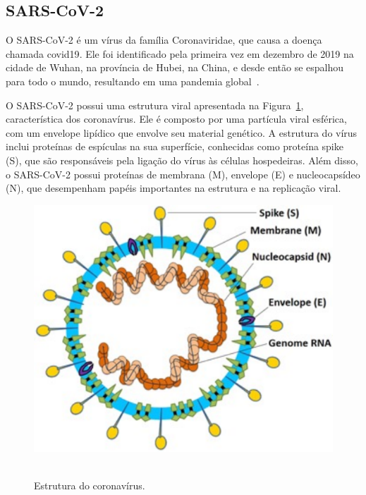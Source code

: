 \subsection{SARS-CoV-2}

O SARS-CoV-2 é um vírus da família Coronaviridae, que causa a doença chamada \gls{covid19}. Ele foi identificado pela primeira vez em dezembro de 2019 na cidade de Wuhan, na província de Hubei, na China, e desde então se espalhou para todo o mundo, resultando em uma pandemia global~\cite{zhu_novel_2020,wu_coronavirus_2020}.

O SARS-CoV-2 possui uma estrutura viral apresentada na Figura~\ref{fig:estruturaCoronavirus}, característica dos coronavírus. Ele é composto por uma partícula viral esférica, com um envelope lipídico que envolve seu material genético. A estrutura do vírus inclui proteínas de espículas na sua superfície, conhecidas como proteína spike (S), que são responsáveis pela ligação do vírus às células hospedeiras. Além disso, o SARS-CoV-2 possui proteínas de membrana (M), envelope (E) e nucleocapsídeo (N), que desempenham papéis importantes na estrutura e na replicação viral.


\begin{figure}[htb]
  \centering
  \caption{Estrutura do coronavírus.}
  \includegraphics[scale=0.8]{figuras/estruturaSarsCov2.pdf}
  ~\label{fig:estruturaCoronavirus}
\end{figure}

